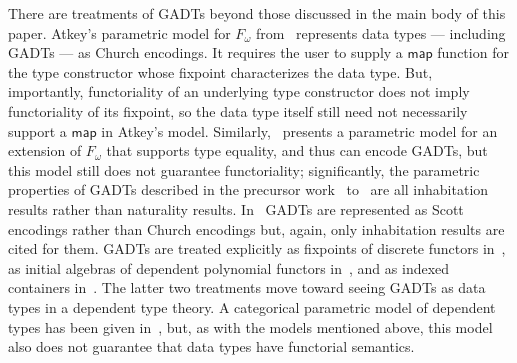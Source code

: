 \documentclass[submission,copyright,creativecommons]{eptcs}
\begin{document}
There are treatments of GADTs beyond those discussed in the main body
of this paper.  Atkey's parametric model for $F_\omega$
from~\cite{atk12} represents data types --- including GADTs --- as
Church encodings. It requires the user to supply a $\mathsf{map}$
function for the type constructor whose fixpoint characterizes the
data type. But, importantly, functoriality of an underlying type
constructor does not imply functoriality of its fixpoint, so the data
type itself still need not necessarily support a $\mathsf{map}$ in
Atkey's model. Similarly,~\cite{vw10} presents a parametric model for
an extension of $F_\omega$ that supports type equality, and thus can
encode GADTs, but this model still does not guarantee functoriality;
significantly, the parametric properties of GADTs described in the
precursor work~\cite{vw06} to~\cite{vw10} are all inhabitation results
rather than naturality results. In~\cite{ms09} GADTs are represented
as Scott encodings rather than Church encodings but, again, only
inhabitation results are cited for them. GADTs are treated explicitly
as fixpoints of discrete functors in~\cite{jg08}, as initial algebras
of dependent polynomial functors in~\cite{gh03,hf11}, and as indexed
containers in~\cite{ma09}. The latter two treatments move toward
seeing GADTs as data types in a dependent type theory. A categorical
parametric model of dependent types has been given in~\cite{agj14},
but, as with the models mentioned above, this model also does not
guarantee that data types have functorial semantics.



\end{document}

